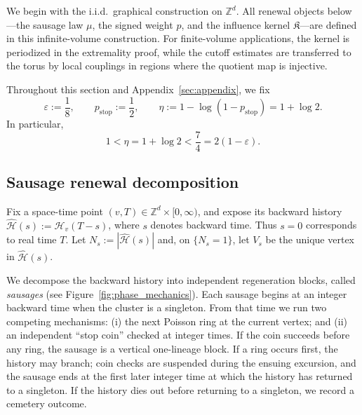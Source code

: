 \documentclass[letterpaper,11pt,reqno]{amsart}
\theoremstyle{definition}
\newcommand{\IK}{\mathfrak{K}}
\begin{document}
We begin with the i.i.d.\ graphical construction on \(\mathbb Z^d\). All renewal objects below---the sausage law \(\mu\), the signed weight \(p\), and the influence kernel \(\IK\)---are defined in this infinite-volume construction. For finite-volume applications, the kernel is periodized in the extremality proof, while the cutoff estimates are transferred to the torus by local couplings in regions where the quotient map is injective.

Throughout this section and Appendix~\ref{sec:appendix}, we fix
\begin{equation}\label{eq:pstop-choice}
    \varepsilon:=\frac18,
    \qquad
    p_{\mathrm{stop}}:=\frac12,
    \qquad
    \eta:=1-\log(1-p_{\mathrm{stop}})=1+\log 2.
\end{equation}
In particular,
\[
    1<\eta=1+\log 2<\frac74=2(1-\varepsilon).
\]

\subsection{Sausage renewal decomposition}
\label{subsec:sausage-def}

Fix a space-time point \((v,T)\in\mathbb Z^d\times[0,\infty)\), and expose its backward
history $\widehat{\mathcal H}(s):=\mathcal H_v(T-s)$, where \(s\) denotes backward time. Thus \(s=0\)
corresponds to real time \(T\). Let \(N_s:=|\widehat{\mathcal H}(s)|\) and, on \(\{N_s=1\}\), let \(V_s\) be
the unique vertex in \(\widehat{\mathcal H}(s)\).



We decompose the backward history into independent regeneration blocks, called \emph{sausages}
(see Figure~\ref{fig:phase_mechanics}).
Each sausage begins at an integer backward time when the cluster is a singleton.
From that time we run two competing mechanisms:
(i) the next Poisson ring at the current vertex; and
(ii) an independent ``stop coin'' checked at integer times.
If the coin succeeds before any ring, the sausage is a vertical one-lineage block.
If a ring occurs first, the history may branch; coin checks are suspended during the ensuing excursion,
and the sausage ends at the first later integer time at which the history has returned to a singleton.
If the history dies out before returning to a singleton, we record a cemetery outcome.
\end{document}
